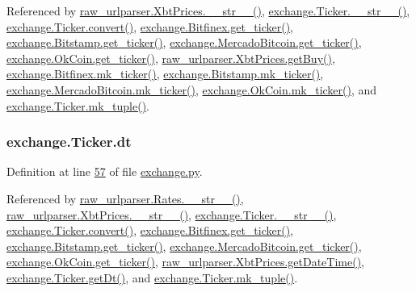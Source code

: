 Referenced by \hyperlink{raw__urlparser_8py_source_l00074}{raw\+\_\+urlparser.\+Xbt\+Prices.\+\_\+\+\_\+str\+\_\+\+\_\+()}, \hyperlink{exchange_8py_source_l00111}{exchange.\+Ticker.\+\_\+\+\_\+str\+\_\+\+\_\+()}, \hyperlink{exchange_8py_source_l00065}{exchange.\+Ticker.\+convert()}, \hyperlink{exchange_8py_source_l00340}{exchange.\+Bitfinex.\+get\+\_\+ticker()}, \hyperlink{exchange_8py_source_l00409}{exchange.\+Bitstamp.\+get\+\_\+ticker()}, \hyperlink{exchange_8py_source_l00543}{exchange.\+Mercado\+Bitcoin.\+get\+\_\+ticker()}, \hyperlink{exchange_8py_source_l00608}{exchange.\+Ok\+Coin.\+get\+\_\+ticker()}, \hyperlink{raw__urlparser_8py_source_l00062}{raw\+\_\+urlparser.\+Xbt\+Prices.\+get\+Buy()}, \hyperlink{exchange_8py_source_l00354}{exchange.\+Bitfinex.\+mk\+\_\+ticker()}, \hyperlink{exchange_8py_source_l00423}{exchange.\+Bitstamp.\+mk\+\_\+ticker()}, \hyperlink{exchange_8py_source_l00557}{exchange.\+Mercado\+Bitcoin.\+mk\+\_\+ticker()}, \hyperlink{exchange_8py_source_l00622}{exchange.\+Ok\+Coin.\+mk\+\_\+ticker()}, and \hyperlink{exchange_8py_source_l00096}{exchange.\+Ticker.\+mk\+\_\+tuple()}.

\subsubsection[{\texorpdfstring{dt}{dt}}]{\setlength{\rightskip}{0pt plus 5cm}exchange.\+Ticker.\+dt}\hypertarget{classexchange_1_1_ticker_a45e3162d9956cee797f21d93c44c6baf}{}\label{classexchange_1_1_ticker_a45e3162d9956cee797f21d93c44c6baf}


Definition at line \hyperlink{exchange_8py_source_l00057}{57} of file \hyperlink{exchange_8py_source}{exchange.\+py}.



Referenced by \hyperlink{raw__urlparser_8py_source_l00038}{raw\+\_\+urlparser.\+Rates.\+\_\+\+\_\+str\+\_\+\+\_\+()}, \hyperlink{raw__urlparser_8py_source_l00074}{raw\+\_\+urlparser.\+Xbt\+Prices.\+\_\+\+\_\+str\+\_\+\+\_\+()}, \hyperlink{exchange_8py_source_l00111}{exchange.\+Ticker.\+\_\+\+\_\+str\+\_\+\+\_\+()}, \hyperlink{exchange_8py_source_l00065}{exchange.\+Ticker.\+convert()}, \hyperlink{exchange_8py_source_l00340}{exchange.\+Bitfinex.\+get\+\_\+ticker()}, \hyperlink{exchange_8py_source_l00409}{exchange.\+Bitstamp.\+get\+\_\+ticker()}, \hyperlink{exchange_8py_source_l00543}{exchange.\+Mercado\+Bitcoin.\+get\+\_\+ticker()}, \hyperlink{exchange_8py_source_l00608}{exchange.\+Ok\+Coin.\+get\+\_\+ticker()}, \hyperlink{raw__urlparser_8py_source_l00059}{raw\+\_\+urlparser.\+Xbt\+Prices.\+get\+Date\+Time()}, \hyperlink{exchange_8py_source_l00093}{exchange.\+Ticker.\+get\+Dt()}, and \hyperlink{exchange_8py_source_l00096}{exchange.\+Ticker.\+mk\+\_\+tuple()}.

